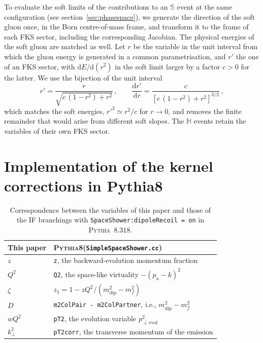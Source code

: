 \documentclass[a4paper,11pt]{article}
\newcommand{\dd}{\mathrm{d}}
\newcommand{\kt}{k_\perp}
\newcommand{\pythia}{\textsc{Pythia8}\xspace}
\newcommand{\code}[1]{\texttt{#1}}
\newcommand{\clS}{\mathbb{S}}
\newcommand{\clH}{\mathbb{H}}
\begin{document}
To evaluate the soft limits of the contributions to an $\clS$ event at
the same configuration (see section~\ref{sec:phasespace}), we generate
the direction of the soft gluon once, in the Born centre-of-mass frame,
and transform it to the frame of each FKS sector, including the
corresponding Jacobian. The physical energies of the soft gluon are
matched as well. Let $r$ be the variable in the unit interval from
which the gluon energy is generated in a common parametrisation, and
$r'$ the one of an FKS sector, with $\dd E/\dd(r^2)$ in the soft limit
larger by a factor $c>0$ for the latter. We use the bijection of the
unit interval
\begin{equation}
  r'=\frac{r}{\sqrt{c\,(1-r^2)+r^2}}\,,\qquad
  \frac{\dd r'}{\dd r}=\frac{c}{\left[c\,(1-r^2)+r^2\right]^{3/2}}\,,
  \label{eq:commonsoft}
\end{equation}
which matches the soft energies, $r'^2\simeq r^2/c$ for $r\to0$, and
removes the finite remainder that would arise from different soft
slopes. The $\clH$ events retain the variables of their own FKS sector.


\section{Implementation of the kernel corrections in Pythia8}
\label{app:pythia}

\begin{table}[t]
  \centering
  \begin{tabular}{@{}ll@{}}
    \toprule
    This paper & \pythia (\code{SimpleSpaceShower.cc})\\
    \midrule
    $z$ & \code{z}, the backward-evolution momentum fraction\\
    $Q^2$ & \code{Q2}, the space-like virtuality $-(p_a-k)^2$\\
    $\zeta$ & $z_1=1-zQ^2/(m_{\mathrm{dip}}^2-m_f^2)$\\
    $D$ & \code{m2ColPair - m2ColPartner}, i.e., $m_{\mathrm{dip}}^2-m_f^2$\\
    $wQ^2$ & \code{pT2}, the evolution variable $p^2_{\perp\mathrm{evol}}$\\
    $\kt^2$ & \code{pT2corr}, the transverse momentum of the emission\\
    \bottomrule
  \end{tabular}
  \caption{Correspondence between the variables of this paper and those
    of the IF branchings with \code{SpaceShower:dipoleRecoil = on} in
    \textsc{Pythia}~8.318.}
  \label{tab:pythiavariables}
\end{table}
\end{document}
